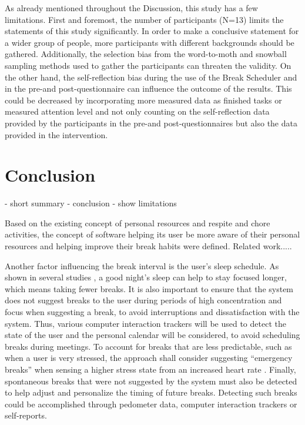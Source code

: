 \documentclass{hasel_thesis}
\begin{document}
As already mentioned throughout the Discussion, this study has a few limitations. First and foremost, the number of participants (N=13) limits the statements of this study significantly. In order to make a conclusive statement for a wider group of people, more participants with different backgrounds should be gathered. Additionally, the selection bias from the word-to-moth and snowball sampling methods used to gather the participants can threaten the validity. On the other hand, the self-reflection bias during the use of the Break Scheduler and in the pre-and post-questionnaire can influence the outcome of the results. This could be decreased by incorporating more measured data as finished tasks or measured attention level and not only counting on the self-reflection data provided by the participants in the pre-and post-questionnaires but also the data provided in the intervention. 


\chapter{Conclusion}

%
- short summary
- conclusion
    - show limitations

Based on the existing concept of personal resources and respite and chore activities, the concept of software helping its user be more aware of their personal resources and helping improve their break habits were defined. Related work.....



Another factor influencing the break interval is the user's sleep schedule. As shown in several studies \cite{Rosekind.2010} \cite{Gingerich.2017} \cite{Choi.2018}, a good night's sleep  can help to stay focused longer, which means taking fewer breaks. 
It is also important to ensure that the system does not suggest breaks to the user during periods of high concentration and focus when suggesting a break, to avoid interruptions and dissatisfaction with the system. Thus, various computer interaction trackers will be used to detect the state of the user and the personal calendar will be considered, to avoid scheduling breaks during meetings. 
To account for breaks that are less predictable, such as when a user is very stressed, the approach shall consider suggesting “emergency breaks” when sensing a higher stress state from an increased heart rate \cite{Hjortskov.2004}. 
Finally, spontaneous breaks that were not suggested by the system must also be detected to help adjust and personalize the timing of future breaks. Detecting such breaks could be accomplished through pedometer data, computer interaction trackers or self-reports. 
\end{document}
